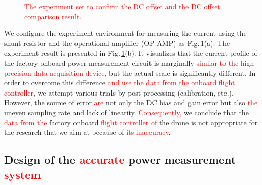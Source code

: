 \documentclass[journal]{./template/IEEEtran}
\begin{document}
\begin{figure}[ht]
\centering
{}
\qquad
{}
\caption{\textcolor{red}{The experiment set to confirm the DC offset and the DC offset comparison result.}}
\label{fig:Ground_test}
\end{figure}

We configure the experiment environment for measuring the current using the shunt resistor and the operational amplifier (OP-AMP) as Fig.\,\ref{fig:Ground_test}(a)\textcolor{red}{.} \textcolor{red}{T}he experiment result is presented in Fig.\,\ref{fig:Ground_test}(b). 
It visualizes that the current profile of the factory onboard power measurement circuit is marginally \textcolor{red}{similar to the high precision data acquisition device,} but the actual scale is significantly different. 
In order to overcome this difference \textcolor{red}{and use the data from the onboard flight controller}, we attempt various trials by post-processing (calibration, etc.). 
However, the source of error \textcolor{red}{are} not only the DC bias and gain error but also \textcolor{red}{the} uneven sampling rate and lack of linearity. 
\textcolor{red}{Consequently,} we conclude that the \textcolor{red}{data from the} factory onboard \textcolor{red}{flight controller of} the drone is not appropriate for the research that we aim at because of \textcolor{red}{its inaccuracy}.




\subsection{Design of the \textcolor{red}{accurate} power measurement \textcolor{red}{system}}
\end{document}
